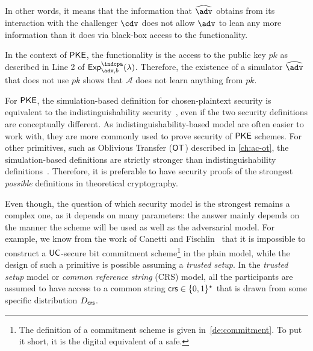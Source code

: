 In other words, it means that the information that $\widehat{\adv}$ obtains from its interaction with the challenger $\cdv$
does not allow $\adv$ to lean any more information than it does via black-box access to the functionality.

In the context of $\textsf{PKE}$, the functionality is the access to the public key $pk$ as described in Line 2 of $\Exp{\indcpa}{\adv, b}(\lambda)$.
Therefore, the existence of a simulator $\widehat{\adv}$ that does not use $pk$ shows that $\mathcal{A}$ does not learn anything from $pk$.

For $\textsf{PKE}$, the simulation-based definition for chosen-plaintext security is equivalent to the indistinguishability security~\cite[Se. 5.2.3]{Gol04}, even if the two security definitions are conceptually different.
As indistinguishability-based model are often easier to work with, they are more commonly used to prove security of $\textsf{PKE}$ schemes.
For other primitives, such as Oblivious Transfer ($\textsf{OT}$) described in \cref{ch:ac-ot}, the simulation-based definitions are strictly stronger than indistinguishability definitions~\cite{NP99}.
Therefore, it is preferable to have security proofs of the strongest \emph{possible} definitions in theoretical cryptography.

Even though, the question of which security model is the strongest remains a complex one, as it depends on many parameters:
the answer mainly depends on the manner the scheme will be used as well as the adversarial model.
For example, we know from the work of Canetti and Fischlin~\cite{CF01} that it is impossible to construct a $\textsf{UC}$-secure bit commitment scheme\footnote{The definition of a commitment scheme is given in~\cref{de:commitment}. To put it short, it is the digital equivalent of a safe.} in the plain model, while the design of such a primitive is possible assuming a \textit{trusted setup}.
In the \textit{trusted setup} model or \textit{common reference string} (\textsf{CRS}) model, all the participants are assumed to have access to a common string $\mathsf{crs} \in \{0,1\}^\star$ that is drawn from some specific distribution $D_\mathsf{crs}$.

